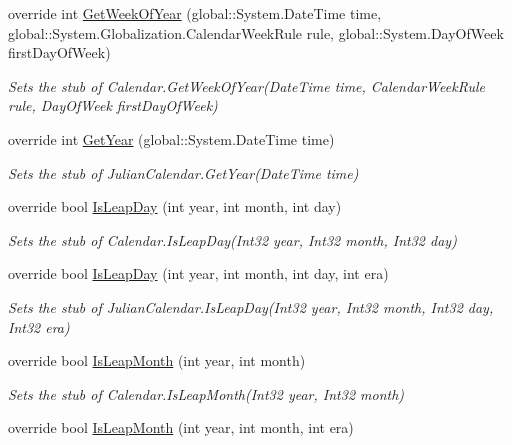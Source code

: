 \begin{DoxyCompactItemize}
override int \hyperlink{class_system_1_1_globalization_1_1_fakes_1_1_stub_julian_calendar_a62c7c51557f91b6b3118472f4405d693}{Get\-Week\-Of\-Year} (global\-::\-System.\-Date\-Time time, global\-::\-System.\-Globalization.\-Calendar\-Week\-Rule rule, global\-::\-System.\-Day\-Of\-Week first\-Day\-Of\-Week)
\begin{DoxyCompactList}\small\item\em Sets the stub of Calendar.\-Get\-Week\-Of\-Year(\-Date\-Time time, Calendar\-Week\-Rule rule, Day\-Of\-Week first\-Day\-Of\-Week)\end{DoxyCompactList}\item 
override int \hyperlink{class_system_1_1_globalization_1_1_fakes_1_1_stub_julian_calendar_a25d7288b89df18ddab667d99f319171e}{Get\-Year} (global\-::\-System.\-Date\-Time time)
\begin{DoxyCompactList}\small\item\em Sets the stub of Julian\-Calendar.\-Get\-Year(\-Date\-Time time)\end{DoxyCompactList}\item 
override bool \hyperlink{class_system_1_1_globalization_1_1_fakes_1_1_stub_julian_calendar_ab4d1d95e1d8f54df6535e4c20a423f27}{Is\-Leap\-Day} (int year, int month, int day)
\begin{DoxyCompactList}\small\item\em Sets the stub of Calendar.\-Is\-Leap\-Day(\-Int32 year, Int32 month, Int32 day)\end{DoxyCompactList}\item 
override bool \hyperlink{class_system_1_1_globalization_1_1_fakes_1_1_stub_julian_calendar_a6b9f21d255eb51390ea27e6208c0ce9f}{Is\-Leap\-Day} (int year, int month, int day, int era)
\begin{DoxyCompactList}\small\item\em Sets the stub of Julian\-Calendar.\-Is\-Leap\-Day(\-Int32 year, Int32 month, Int32 day, Int32 era)\end{DoxyCompactList}\item 
override bool \hyperlink{class_system_1_1_globalization_1_1_fakes_1_1_stub_julian_calendar_aed74a6aae7da4afca9df167cd44246aa}{Is\-Leap\-Month} (int year, int month)
\begin{DoxyCompactList}\small\item\em Sets the stub of Calendar.\-Is\-Leap\-Month(\-Int32 year, Int32 month)\end{DoxyCompactList}\item 
override bool \hyperlink{class_system_1_1_globalization_1_1_fakes_1_1_stub_julian_calendar_a8750deb4761e9befb9f3a21bd8b9905c}{Is\-Leap\-Month} (int year, int month, int era)

\end{DoxyCompactItemize}
